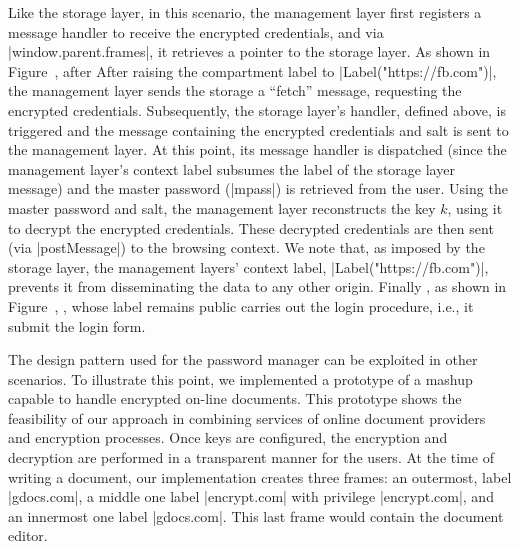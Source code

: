 Like the storage layer, in this scenario, the management layer first
registers a message handler to receive the encrypted credentials, and
via \js|window.parent.frames|, it retrieves a pointer to the storage
layer.
%
\iffigures
\ifcompletefigures
As shown in Figure~, after 
\fi
\else
After
\fi
raising the
compartment label to \js|Label("https://fb.com")|, the management
layer sends the storage a ``fetch'' message, requesting the encrypted
credentials.
%
%
Subsequently, the storage layer's handler, defined above, is triggered
and the message containing the encrypted
credentials and salt is sent to the management layer.
%
At this point, its message handler is dispatched (since the management
layer's context label subsumes the label of the storage layer message)
and the master password (\js|mpass|) is retrieved from the user. 
%
Using the master password and salt, the management layer reconstructs
the key $k$, using it to decrypt the encrypted credentials.
%
These decrypted credentials are then sent (via \js|postMessage|) to
the  browsing context.
%
We note that, as imposed by the storage layer, the management layers'
context label, \js|Label("https://fb.com")|, prevents it from
disseminating the data to any other origin.
%
Finally
\iffigures
\ifcompletefigures
, as shown in Figure~, 
\fi
\fi
{},
whose label remains public carries out the login procedure, i.e., it
submit the login form.

The design pattern used for the password manager can be exploited in other
scenarios. To illustrate this point, we implemented a prototype of a
mashup capable to handle encrypted on-line documents.
This prototype shows the feasibility of our approach in combining services of
online document providers and encryption processes. Once keys are configured,
the encryption and decryption are performed in a transparent manner for the
users. At the time of writing a document, our implementation
creates three frames: an outermost, label \js|gdocs.com|, a middle one label
\js|encrypt.com| with privilege \js|encrypt.com|, and an innermost one label
\js|gdocs.com|. This last frame would contain the document editor.

